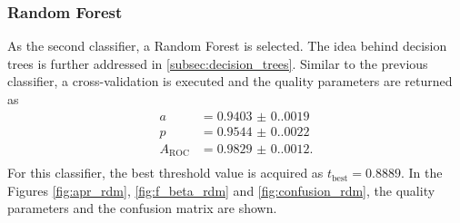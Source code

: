 \subsubsection{Random Forest}
As the second classifier, a Random Forest is selected. The idea behind decision trees is further addressed in \autoref{subsec:decision_trees}. Similar to the previous classifier,
a cross-validation is executed and the quality parameters are returned as
\begin{align*}
    a &= \num{0.9403(0.0019)} \\
    p &= \num{0.9544(0.0022)}  \\
    A_{\mathrm{ROC}} &= \num{0.9829(0.0012)}. \\
\end{align*}
For this classifier, the best threshold value is acquired as $t_{\mathrm{best}} = \num{0.8889}$. In the Figures \ref{fig:apr_rdm}, \ref{fig:f_beta_rdm} and \ref{fig:confusion_rdm}, the quality parameters
and the confusion matrix are shown.
